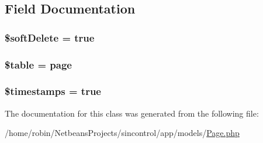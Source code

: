 \subsection{Field Documentation}
\hypertarget{class_page_a4cc511ae1e6d03cb2310e93d18f409cd}{}
\subsubsection[{\$soft\+Delete}]{\setlength{\rightskip}{0pt plus 5cm}\$soft\+Delete = true\hspace{0.3cm}{\ttfamily [protected]}}\label{class_page_a4cc511ae1e6d03cb2310e93d18f409cd}
\hypertarget{class_page_ae8876a14058f368335baccf35af4a22b}{}
\subsubsection[{\$table}]{\setlength{\rightskip}{0pt plus 5cm}\$table = \textquotesingle{}page\textquotesingle{}\hspace{0.3cm}{\ttfamily [protected]}}\label{class_page_ae8876a14058f368335baccf35af4a22b}
\hypertarget{class_page_a51267c24c8fae742ed8f9be0ba6085ee}{}
\subsubsection[{\$timestamps}]{\setlength{\rightskip}{0pt plus 5cm}\$timestamps = true}\label{class_page_a51267c24c8fae742ed8f9be0ba6085ee}


The documentation for this class was generated from the following file\+:\begin{DoxyCompactItemize}
\item 
/home/robin/\+Netbeans\+Projects/sincontrol/app/models/\hyperlink{_page_8php}{Page.\+php}\end{DoxyCompactItemize}
